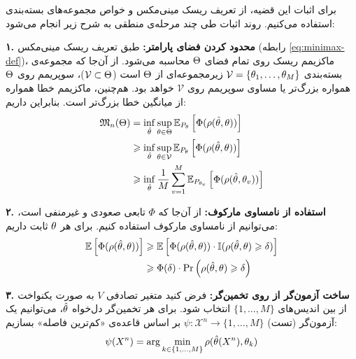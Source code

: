 \begin{اثبات}
برای اثبات این قضیه، از تعریف ریسک مینی‌مکس و خواص مجموعه‌های بسته‌بندی استفاده می‌کنیم. روند اثبات طی چند مرحله‌ی منطقی به شرح زیر انجام می‌شود:

\textbf{۱. محدود کردن فضای پارامتر:}
طبق تعریف ریسک مینی‌مکس (رابطه \ref{eq:minimax-def})، ماکزیمم ریسک روی تمام فضای $\Theta$ محاسبه می‌شود. از آن‌جا که مجموعه‌ی بسته‌بندی $\mathcal{V} = \{\theta_1, \dots, \theta_M\}$ زیرمجموعه‌ای از $\Theta$ است ($\mathcal{V} \subset \Theta$)، سوپریمم روی $\Theta$ همواره بزرگ‌تر یا مساوی سوپریمم روی $\mathcal{V}$ خواهد بود. هم‌چنین، ماکزیمم خطا همواره از میانگین خطا بزرگ‌تر است. بنابراین داریم:
\begin{align}
\mathfrak{M}_n(\Thh) &= \inf_{\hat{\thh}} \sup_{\thh \in \Thh} \Eset_{P_\thh} \left[ \Phi(\rho(\hat{\thh}, \thh)) \right] \nonumber \\
&\ge \inf_{\hat{\thh}} \sup_{\thh \in \mathcal{V}} \Eset_{P_\thh} \left[ \Phi(\rho(\hat{\thh}, \thh)) \right] \nonumber \\
&\ge \inf_{\hat{\thh}} \frac{1}{M} \sum_{v=1}^M \Eset_{P_{\thh_v}} \left[ \Phi(\rho(\hat{\thh}, \thh_v)) \right] \label{eq:proof-step1}
\end{align}

\textbf{۲. استفاده از نامساوی مارکوف:}
از آن‌جا که $\Phi$ تابعی صعودی و غیرمنفی است، می‌توانیم از نامساوی مارکوف استفاده کنیم. برای هر $\theta$ ثابت داریم:
\begin{align}
\Eset \left[ \Phi(\rho(\hat{\thh}, \thh)) \right] &\ge \Eset \left[ \Phi(\rho(\hat{\thh}, \thh)) \cdot \mathbb{I}(\rho(\hat{\thh}, \thh) \ge \delta) \right] \nonumber \\
&\ge \Phi(\delta) \cdot \Pr \left( \rho(\hat{\thh}, \thh) \ge \delta \right) \label{eq:proof-step2}
\end{align}

\textbf{۳. ساخت آزمون‌گر از روی تخمین‌گر:}
فرض کنید متغیر تصادفی $V$ به صورت یکنواخت از بین اندیس‌های $\{1, \dots, M\}$ انتخاب شود. برای هر تخمین‌گر دل‌خواه $\hat{\theta}$، می‌توانیم یک آزمون‌گر (تست) $\psi: \mathcal{X}^n \to \{1, \dots, M\}$ بر اساس قاعده‌ی «کم‌ترین فاصله» بسازیم:
\begin{equation}
\psi(X^n) = \arg \min_{k \in \{1, \dots, M\}} \rho(\hat{\theta}(X^n), \theta_k)
\end{equation}


\end{اثبات}
